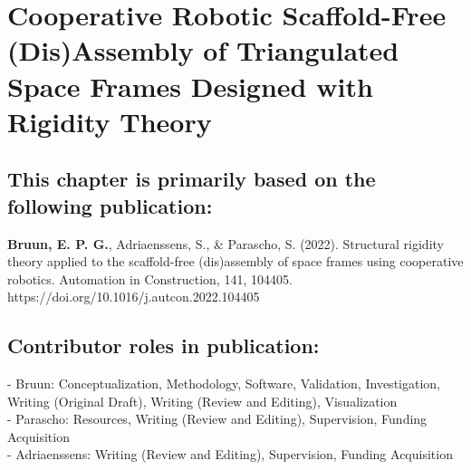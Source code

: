 
\graphicspath{{./\figurefolder/5SpaceFrame/}}

\chapter{Cooperative Robotic Scaffold-Free (Dis)Assembly of Triangulated Space Frames Designed with Rigidity Theory} \label{chap:5_SpaceFrame}

\thispagestyle{empty}

\vfill 
\section*{\normalsize\textmd{This chapter is primarily based on the following publication:}}
    \vspace{-0.3cm}
    \textbf{Bruun, E. P. G.}, Adriaenssens, S., \& Parascho, S. (2022). Structural rigidity theory applied to the scaffold-free (dis)assembly of space frames using cooperative robotics. Automation in Construction, 141, 104405. https://doi.org/10.1016/j.autcon.2022.104405

\section*{\normalsize\textmd{Contributor roles in publication:}}
    \vspace{-0.3cm}\noindent
    - Bruun: Conceptualization, Methodology, Software, Validation, Investigation, Writing (Original Draft), Writing (Review and Editing), Visualization\\
    - Parascho: Resources, Writing (Review and Editing), Supervision, Funding Acquisition \\
    - Adriaenssens: Writing (Review and Editing), Supervision, Funding Acquisition \\


